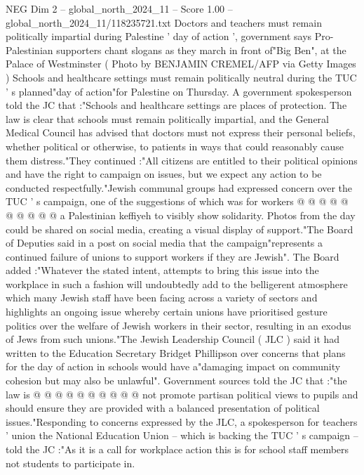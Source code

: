 \begin{textsample}{NEG Dim 2 – global\_north\_2024\_11 – Score 1.00 – global\_north\_2024\_11/118235721.txt}  \label{ex:f2_neg_184}
Doctors and teachers must remain politically impartial during Palestine ' day of action ', government says Pro-Palestinian supporters chant slogans as they march in front of"Big Ben", at the Palace of Westminster ( Photo by BENJAMIN CREMEL/AFP via Getty Images ) Schools and healthcare settings must remain politically neutral during the TUC ' s planned"day of action"for Palestine on Thursday.
A government spokesperson told the JC that :"Schools and healthcare settings are places of protection.
The law is clear that schools must remain politically impartial, and the General Medical Council has advised that doctors must not express their personal beliefs, whether political or otherwise, to patients in ways that could reasonably cause them distress."They continued :"All citizens are entitled to their political opinions and have the right to campaign on issues, but we expect any action to be conducted respectfully."Jewish communal groups had expressed concern over the TUC ' s campaign, one of the suggestions of which was for workers @ @ @ @ @ @ @ @ @ @ a Palestinian keffiyeh to visibly show solidarity.
Photos from the day could be shared on social media, creating a visual display of support."The Board of Deputies said in a post on social media that the campaign"represents a continued failure of unions to support workers if they are Jewish".
The Board added :"Whatever the stated intent, attempts to bring this issue into the workplace in such a fashion will undoubtedly add to the belligerent atmosphere which many Jewish staff have been facing across a variety of sectors and highlights an ongoing issue whereby certain unions have prioritised gesture politics over the welfare of Jewish workers in their sector, resulting in an exodus of Jews from such unions."The Jewish Leadership Council ( JLC ) said it had written to the Education Secretary Bridget Phillipson over concerns that plans for the day of action in schools would have a"damaging impact on community cohesion but may also be unlawful".
Government sources told the JC that :"the law is @ @ @ @ @ @ @ @ @ @ not promote partisan political views to pupils and should ensure they are provided with a balanced presentation of political issues."Responding to concerns expressed by the JLC, a spokesperson for teachers ' union the National Education Union -- which is backing the TUC ' s campaign -- told the JC :"As it is a call for workplace action this is for school staff members not students to participate in.

\end{textsample}
